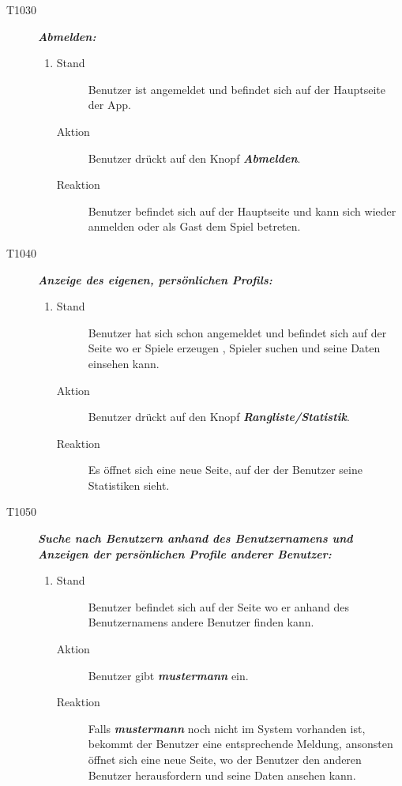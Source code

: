 \documentclass[parskip=full]{scrartcl}
\begin{document}
\begin{description}
\begin{enumerate}
	\end{enumerate}
	\item[T1030] \textbf{\textit{Abmelden: }} 
	\begin{enumerate}
		\item 
		\begin{description}
			\item[Stand] Benutzer ist angemeldet und befindet sich auf der Hauptseite der App.
			\item[Aktion] Benutzer drückt auf den Knopf \textbf{\textit{Abmelden}}.
			\item[Reaktion] Benutzer befindet sich auf der Hauptseite und kann sich wieder anmelden oder als Gast dem Spiel betreten.
		\end{description}
	\end{enumerate}
	
	\item[T1040] \textbf{\textit{Anzeige des eigenen, persönlichen Profils: }} 
	\begin{enumerate}
		\item 
		\begin{description}
			\item[Stand] Benutzer hat sich schon angemeldet und befindet sich auf der Seite wo er Spiele erzeugen , Spieler suchen und seine Daten einsehen kann.
			\item[Aktion] Benutzer drückt auf den Knopf \textbf{\textit{Rangliste/Statistik}}.
			\item[Reaktion] Es öffnet sich eine neue Seite, auf der der Benutzer seine Statistiken sieht.
		\end{description}
	\end{enumerate}
	
	\item[T1050] \textbf{\textit{Suche nach Benutzern anhand des Benutzernamens und Anzeigen der persönlichen Profile anderer Benutzer: }} 
	\begin{enumerate}
		\item 
		\begin{description}
			\item[Stand] Benutzer befindet sich auf der Seite wo er anhand des Benutzernamens andere Benutzer finden kann.
			\item[Aktion] Benutzer gibt \textbf{\textit{mustermann }}ein.
			\item[Reaktion] Falls \textbf{\textit{mustermann }}noch nicht im System vorhanden ist, bekommt der Benutzer eine entsprechende Meldung, ansonsten öffnet sich eine neue Seite, wo der Benutzer den anderen Benutzer herausfordern und seine Daten ansehen kann.
		\end{description}
	\end{enumerate}
	

\end{description}
\end{document}
